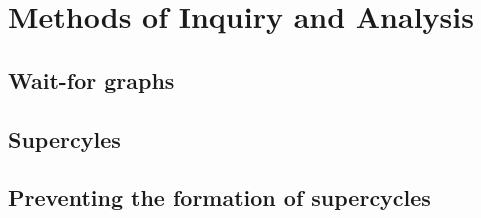 \section{Methods of Inquiry and Analysis}

\subsection{Wait-for graphs}

\subsection{Supercyles}

\subsection{Preventing the formation of supercycles}


